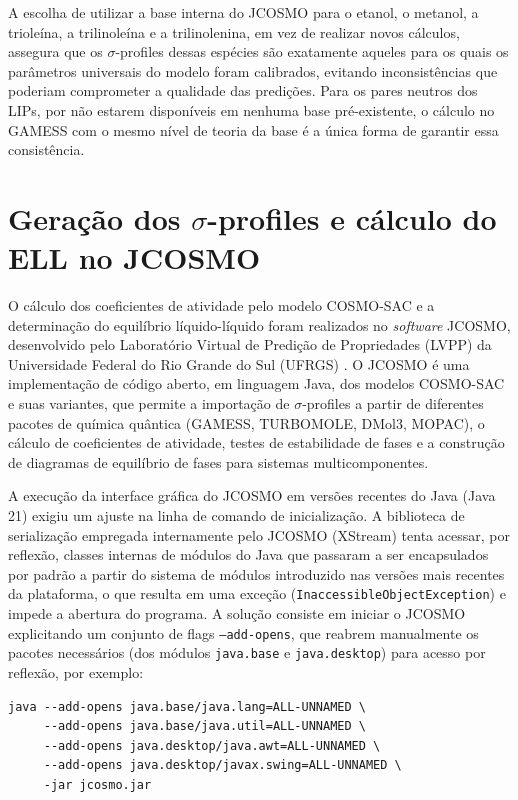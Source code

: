 A escolha de utilizar a base interna do JCOSMO para o etanol, o metanol, a trioleína, a trilinoleína e a trilinolenina, em vez de realizar novos cálculos, assegura que os $\sigma$-profiles dessas espécies são exatamente aqueles para os quais os parâmetros universais do modelo foram calibrados, evitando inconsistências que poderiam comprometer a qualidade das predições. Para os pares neutros dos LIPs, por não estarem disponíveis em nenhuma base pré-existente, o cálculo no GAMESS com o mesmo nível de teoria da base é a única forma de garantir essa consistência.

\section{Geração dos \texorpdfstring{$\sigma$}{sigma}-profiles e cálculo do ELL no JCOSMO}
\label{sec:jcosmo}

O cálculo dos coeficientes de atividade pelo modelo COSMO-SAC e a determinação do equilíbrio líquido-líquido foram realizados no \textit{software} JCOSMO, desenvolvido pelo Laboratório Virtual de Predição de Propriedades (LVPP) da Universidade Federal do Rio Grande do Sul (UFRGS) \cite{gerber2010}. O JCOSMO é uma implementação de código aberto, em linguagem Java, dos modelos COSMO-SAC e suas variantes, que permite a importação de $\sigma$-profiles a partir de diferentes pacotes de química quântica (GAMESS, TURBOMOLE, DMol3, MOPAC), o cálculo de coeficientes de atividade, testes de estabilidade de fases e a construção de diagramas de equilíbrio de fases para sistemas multicomponentes.

A execução da interface gráfica do JCOSMO em versões recentes do Java (Java 21) exigiu um ajuste na linha de comando de inicialização. A biblioteca de serialização empregada internamente pelo JCOSMO (XStream) tenta acessar, por reflexão, classes internas de módulos do Java que passaram a ser encapsulados por padrão a partir do sistema de módulos introduzido nas versões mais recentes da plataforma, o que resulta em uma exceção (\texttt{InaccessibleObjectException}) e impede a abertura do programa. A solução consiste em iniciar o JCOSMO explicitando um conjunto de flags \texttt{--add-opens}, que reabrem manualmente os pacotes necessários (dos módulos \texttt{java.base} e \texttt{java.desktop}) para acesso por reflexão, por exemplo:

\begin{verbatim}
java --add-opens java.base/java.lang=ALL-UNNAMED \
     --add-opens java.base/java.util=ALL-UNNAMED \
     --add-opens java.desktop/java.awt=ALL-UNNAMED \
     --add-opens java.desktop/javax.swing=ALL-UNNAMED \
     -jar jcosmo.jar
\end{verbatim}

